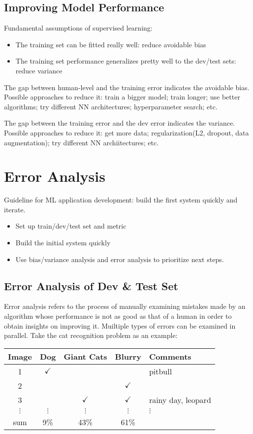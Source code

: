 \subsection{Improving Model Performance}
Fundamental assumptions of supervised learning:
\begin{itemize}
  \item The training set can be fitted really well: reduce avoidable bias
  \item The training set performance generalizes pretty well to the dev/test sets: reduce variance
\end{itemize}
The gap between human-level and the training error indicates the avoidable bias. Possible approaches to reduce it: train a bigger model; train longer; use better algorithms; try different NN architectures; hyperparameter search; etc.

The gap between the training error and the dev error indicates the variance. Possible approaches to reduce it: get more data; regularization(L2, dropout, data augmentation); try different NN archiitectures; etc.
\section{Error Analysis}
Guideline for ML application development: build the first system quickly and iterate.
  \begin{itemize}
    \item Set up train/dev/test set and metric
    \item Build the initial system quickly
    \item Use bias/variance analysis and error analysis to prioritize next steps.
  \end{itemize}
\subsection{Error Analysis of Dev \& Test Set}
Error analysis refers to the process of manually examining mistakes made by an algorithm whose performance is not as good as that of a human in order to obtain insights on improving it. Muiltiple types of errors can be examined in parallel. Take the cat recognition problem as an example:

\begin{table}[ht]
  \centering
  \begin{tabular}{c|cccp{50pt}}
    Image & Dog & Giant Cats & Blurry & Comments \\\hline
    1 & $\checkmark$ & & & pitbull \\
    2 &  & & $\checkmark$ &  \\
    3 & & $\checkmark$ & $\checkmark$ & rainy day, \newline leopard \\
    $\vdots$ & $\vdots$ & $\vdots$ & $\vdots$ & $\vdots$ \\
    sum & 9\% & 43\% & 61\% \\
  \end{tabular}
\end{table}

